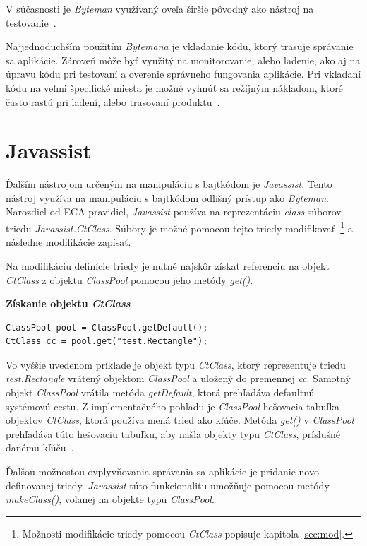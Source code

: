 \documentclass[11pt,final,oneside]{fithesis}
\newenvironment{example}[1]
{
\vspace{3mm}
\noindent\textbf{#1}
\vspace{2mm}
}
{
\vspace{3mm}
}
\begin{document}
V súčasnosti je \textit{Byteman} využívaný oveľa širšie pôvodný ako nástroj na
testovanie~\cite{RedHat:Byteman}. 

Najjednoduchším použitím \textit{Bytemana} je vkladanie kódu, ktorý trasuje 
správanie sa aplikácie. Zároveň môže byť využitý na monitorovanie,
alebo ladenie, ako aj na úpravu kódu pri testovaní a overenie správneho 
fungovania aplikácie. Pri vkladaní kódu na veľmi špecifické miesta je možné
vyhnúť sa režijným nákladom, ktoré často rastú pri ladení, alebo trasovaní 
produktu~\cite{Byteman:Homepage}.

\chapter{Javassist}

Ďalším nástrojom určeným na manipuláciu s bajtkódom je \textit{Javassist}. 
Tento nástroj využíva na manipuláciu s bajtkódom odlišný prístup ako
\textit{Byteman}. Narozdiel od ECA pravidiel, \textit{Javassist} používa na 
reprezentáciu \textit{class} súborov triedu \textit{Javassist.CtClass}.
Súbory je možné pomocou tejto triedy
modifikovať~\footnote{Možnosti modifikácie triedy pomocou \textit{CtClass} 
popisuje kapitola \ref{sec:mod}.} a následne modifikácie zapísať.

Na modifikáciu definície triedy je nutné najskôr získať referenciu na objekt
\textit{CtClass} z objektu \textit{ClassPool} pomocou jeho metódy
\textit{get()}.

\begin{example}{Získanie objektu \textit{CtClass}}
\begin{verbatim}
ClassPool pool = ClassPool.getDefault();
CtClass cc = pool.get("test.Rectangle");
\end{verbatim}
\end{example}

Vo vyššie uvedenom príklade je objekt typu \textit{CtClass}, ktorý reprezentuje
triedu \textit{test.Rectangle} vrátený objektom \textit{ClassPool} a uložený do
premennej \textit{cc}. Samotný objekt \textit{ClassPool} vrátila metóda 
\textit{getDefault}, ktorá prehľadáva defaultnú systémovú cestu. Z 
implementačného pohľadu je \textit{ClassPool} hešovacia tabuľka objektov
\textit{CtClass}, ktorá používa mená tried ako kľúče. Metóda \textit{get()} v
\textit{ClassPool} prehľadáva túto hešovaciu tabuľku, aby našla objekty typu
\textit{CtClass}, príslušné danému kľúču~\cite{Chiba:Javassist}.

Ďalšou možnosťou ovplyvňovania správania sa aplikácie je pridanie novo 
definovanej triedy. \textit{Javassist} túto funkcionalitu umožňuje pomocou 
metódy \textit{makeClass()}, volanej na objekte typu \textit{ClassPool}.
\end{document}
